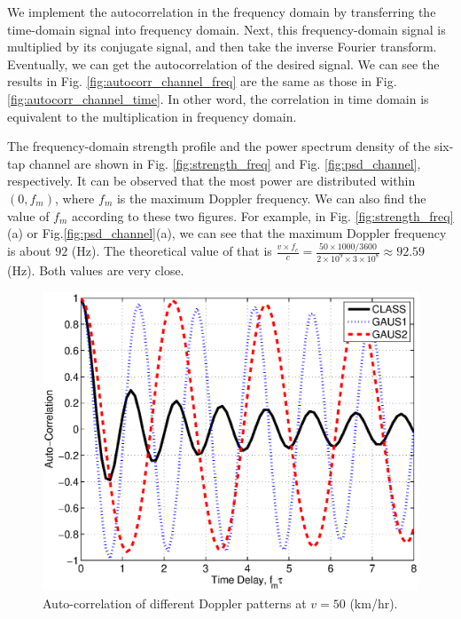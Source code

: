 \documentclass[12pt, draftclsnofoot, onecolumn]{IEEEtran}
\begin{document}
We implement the autocorrelation in the frequency domain by transferring the time-domain signal into frequency domain. Next, this frequency-domain signal is multiplied by its conjugate signal, and then take the inverse Fourier transform. Eventually, we can get the autocorrelation of the desired signal. We can see the results in Fig. \ref{fig:autocorr_channel_freq} are the same as those in Fig. \ref{fig:autocorr_channel_time}. In other word, the correlation in time domain is equivalent to the multiplication in frequency domain.



The frequency-domain strength profile and the power spectrum density of the six-tap channel are shown in Fig. \ref{fig:strength_freq} and Fig. \ref{fig:psd_channel}, respectively. It can be observed that the most power are distributed within $(0, f_m)$, where $f_m$ is the maximum Doppler frequency. We can also find the value of $f_m$ according to these two figures. For example, in Fig.  \ref{fig:strength_freq}(a) or Fig.\ref{fig:psd_channel}(a), we can see that the maximum Doppler frequency is about $92$ (Hz). The theoretical value of that is $\frac{v\times f_c}{c} = \frac{50\times1000/3600}{2\times10^9\times 3\times10^8}\approx 92.59$ (Hz). Both values are very close.



\begin{figure}[t]
\centering
\includegraphics[width=.6\linewidth]{autocorr_compareall_v50.eps}
\caption{Auto-correlation of different Doppler patterns at $v = 50$ (km/hr).}\label{fig:autocorr_all}
\end{figure}
\end{document}
